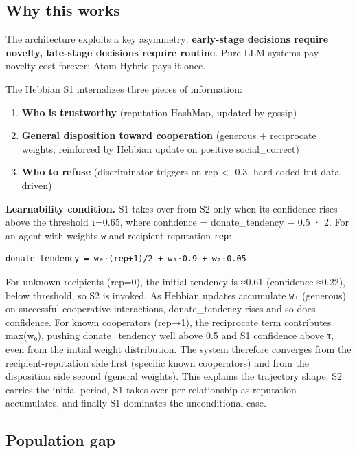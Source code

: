 \documentclass[
  11pt,
  letterpaper,
]{article}
\providecommand{\tightlist}{%
  \setlength{\itemsep}{0pt}\setlength{\parskip}{0pt}}
\begin{document}
\subsection{Why this works}\label{why-this-works}

The architecture exploits a key asymmetry: \textbf{early-stage decisions
require novelty, late-stage decisions require routine}. Pure LLM systems
pay novelty cost forever; Atom Hybrid pays it once.

The Hebbian S1 internalizes three pieces of information:

\begin{enumerate}
\def\labelenumi{\arabic{enumi}.}
\tightlist
\item
  \textbf{Who is trustworthy} (reputation HashMap, updated by gossip)
\item
  \textbf{General disposition toward cooperation} (generous +
  reciprocate weights, reinforced by Hebbian update on positive
  social\_correct)
\item
  \textbf{Who to refuse} (discriminator triggers on rep \textless{}
  -0.3, hard-coded but data-driven)
\end{enumerate}

\textbf{Learnability condition.} S1 takes over from S2 only when its
confidence rises above the threshold τ=0.65, where confidence =
\textbar donate\_tendency − 0.5\textbar{} · 2. For an agent with weights
\texttt{w} and recipient reputation \texttt{rep}:

\begin{verbatim}
donate_tendency = w₀·(rep+1)/2 + w₁·0.9 + w₂·0.05
\end{verbatim}

For unknown recipients (rep=0), the initial tendency is ≈0.61
(confidence ≈0.22), below threshold, so S2 is invoked. As Hebbian
updates accumulate \texttt{w₁} (generous) on successful cooperative
interactions, donate\_tendency rises and so does confidence. For known
cooperators (rep→1), the reciprocate term contributes max(w₀), pushing
donate\_tendency well above 0.5 and S1 confidence above τ, even from the
initial weight distribution. The system therefore converges from the
recipient-reputation side first (specific known cooperators) and from
the disposition side second (general weights). This explains the
trajectory shape: S2 carries the initial period, S1 takes over
per-relationship as reputation accumulates, and finally S1 dominates the
unconditional case.

\subsection{Population gap}\label{population-gap}
\end{document}
